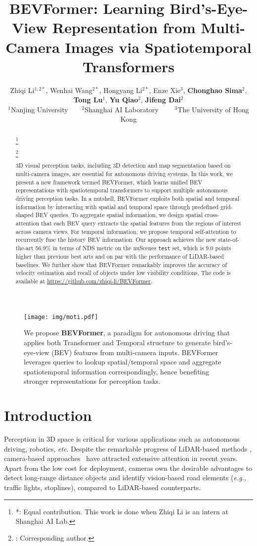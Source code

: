 \documentclass{article}
\title{BEVFormer: Learning Bird's-Eye-View Representation from Multi-Camera Images via Spatiotemporal Transformers}
\author{
Zhiqi Li$^{1,2*}$,
Wenhai Wang$^{2*}$,
Hongyang Li$^{2*}$,
Enze Xie$^3$,
\textbf{Chonghao Sima}$^{2}$, \\
\textbf{Tong Lu}$^{1}$,
\textbf{Yu Qiao}$^{2}$,
\textbf{Jifeng Dai}$^{2}$\textsuperscript{\Letter}
\\ [0.15cm]
$^1$Nanjing University~~~~$^2$Shanghai AI Laboratory~~~~
$^3$The University of Hong Kong
}
\newcommand\blfootnote[1]{\begingroup
\renewcommand\thefootnote{}\footnote{#1}\addtocounter{footnote}{-1}\endgroup
}
\begin{document}
\maketitle
\begin{figure}[h]
\centering
\texttt{[image: img/moti.pdf]}
\caption{We propose \textbf{BEVFormer}, a paradigm
for autonomous driving that applies 
both Transformer and Temporal structure to generate 
bird's-eye-view (BEV) features from multi-camera inputs. 
BEVFormer leverages 
queries to lookup spatial/temporal space and aggregate spatiotemporal information correspondingly, 
hence benefiting stronger representations for perception tasks.
}
\label{fig:moti}
\end{figure}



\begin{abstract}
\blfootnote{*: Equal contribution. This work is done when Zhiqi Li is an intern at Shanghai AI Lab.}
\blfootnote{\Letter: Corresponding author.}
3D visual perception tasks, including 3D detection and map segmentation based on multi-camera images, are essential for autonomous driving systems. In this work, we present a new framework termed BEVFormer, which learns unified BEV representations with spatiotemporal transformers to support multiple autonomous driving perception tasks. In a nutshell, BEVFormer exploits both spatial and temporal information by interacting with spatial and temporal space through predefined grid-shaped BEV queries. To aggregate spatial information, we design spatial cross-attention that each BEV query extracts the spatial features from the regions of interest across camera views. For temporal information, we propose temporal self-attention to recurrently fuse the history BEV information.
Our approach achieves the new state-of-the-art 56.9\% in terms of NDS metric on the nuScenes \texttt{test} set, which is 9.0 points higher than previous best arts and on par with the performance of LiDAR-based baselines. We further show that BEVFormer remarkably improves the accuracy of velocity estimation and recall of objects under low visibility conditions. The code is available at \url{https://github.com/zhiqi-li/BEVFormer}.


\end{abstract}



\section{Introduction}
Perception in 3D space is critical for various applications such as autonomous driving, robotics, \textit{etc}.
Despite the remarkable progress of LiDAR-based methods \cite{vora2020pointpainting,lang2019pointpillars,zhou2018voxelnet,yan2018second,chen2017multi},
camera-based approaches~\cite{wang2021fcos3d,philion2020lift,wang2022detr3d,pan2020cross} have attracted extensive attention in recent years.
Apart from the low cost for deployment, cameras own the desirable advantages to detect long-range distance objects and identify vision-based road elements (\textit{e.g.}, traffic lights, stoplines), compared to LiDAR-based counterparts.
\end{document}
